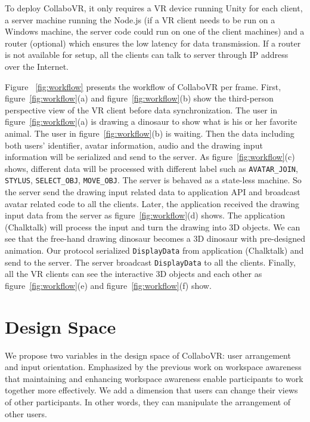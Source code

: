 \documentclass{sigchi}
\begin{document}
To deploy CollaboVR, it only requires a VR device running Unity for each client, a server machine running the Node.js (if a VR client needs to be run on a Windows machine, the server code could run on one of the client machines) and a router (optional) which ensures the low latency for data transmission. If a router is not available for setup, all the clients can talk to server through IP address over the Internet. 


Figure ~\ref{fig:workflow} presents the workflow of CollaboVR per frame. First, figure~\ref{fig:workflow}(a) and figure~\ref{fig:workflow}(b) show the third-person perspective view of the VR client before data synchronization. The user in figure~\ref{fig:workflow}(a) is drawing a dinosaur to show what is his or her favorite animal. The user in figure~\ref{fig:workflow}(b) is waiting. Then the data including both users' identifier, avatar information, audio and the drawing input information will be serialized and send to the server. As figure~\ref{fig:workflow}(c) shows, different data will be processed with different label such as \verb|AVATAR_JOIN|, \verb|STYLUS|, \verb|SELECT_OBJ|, \verb|MOVE_OBJ|. The server is behaved as a state-less machine. So the server send the drawing input related data to application API and broadcast avatar related code to all the clients. Later, the application received the drawing input data from the server as figure~\ref{fig:workflow}(d) shows. The application (Chalktalk) will process the input and turn the drawing into 3D objects. We can see that the free-hand drawing dinosaur becomes a 3D dinosaur with pre-designed animation. Our protocol serialized \verb|DisplayData| from application (Chalktalk) and send to the server. The server broadcast \verb|DisplayData| to all the clients. Finally, all the VR clients can see the interactive 3D objects and each other as figure~\ref{fig:workflow}(e) and figure~\ref{fig:workflow}(f) show.

\section{Design Space}
We propose two variables in the design space of CollaboVR: user arrangement and input orientation. Emphasized by the previous work on workspace awareness that maintaining and enhancing workspace awareness enable participants to work together more effectively. We add a dimension that users can change their views of other participants. In other words, they can manipulate the arrangement of other users. 
\end{document}
